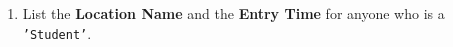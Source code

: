 \documentclass[12pt,a4paper]{article}
\begin{document}
\begin{enumerate}

    \item List the \textbf{Location Name} and the \textbf{Entry Time} for anyone who is a \texttt{'Student'}.






\end{enumerate}
\end{document}
